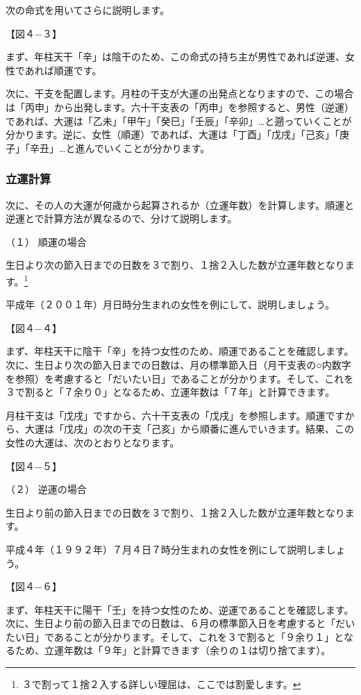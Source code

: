\documentclass[a5paper,11pt,dvipdfmx]{tarticle}
\begin{document}
次の命式を用いてさらに説明します。

【図４−３】

まず、年柱天干「辛」は陰干のため、この命式の持ち主が男性であれば逆運、女性であれば順運です。

次に、干支を配置します。月柱の干支が大運の出発点となりますので、この場合は「丙申」から出発します。六十干支表の「丙申」を参照すると、男性（逆運）であれば、大運は「乙未」「甲午」「癸巳」「壬辰」「辛卯」…と遡っていくことが分かります。逆に、女性（順運）であれば、大運は「丁酉」「戊戌」「己亥」「庚子」「辛丑」…と進んでいくことが分かります。

\subsubsection*{立運計算}
次に、その人の大運が何歳から起算されるか（立運年数）を計算します。順運と逆運とで計算方法が異なるので、分けて説明します。

（１）	順運の場合

生日より次の節入日までの日数を３で割り、１捨２入した数が立運年数となります。\footnote{３で割って１捨２入する詳しい理屈は、ここでは割愛します。}

平成年（２００１年）月日時分生まれの女性を例にして、説明しましょう。

【図４−４】

まず、年柱天干に陰干「辛」を持つ女性のため、順運であることを確認します。次に、生日より次の節入日までの日数は、月の標準節入日（月干支表の○内数字を参照）を考慮すると「だいたい日」であることが分かります。そして、これを３で割ると「７余り０」となるため、立運年数は「７年」と計算できます。

月柱干支は「戊戌」ですから、六十干支表の「戊戌」を参照します。順運ですから、大運は「戊戌」の次の干支「己亥」から順番に進んでいきます。結果、この女性の大運は、次のとおりとなります。

【図４−５】

（２）	逆運の場合

生日より前の節入日までの日数を３で割り、１捨２入した数が立運年数となります。

平成４年（１９９２年）７月４日７時分生まれの女性を例にして説明しましょう。

【図４−６】

まず、年柱天干に陽干「壬」を持つ女性のため、逆運であることを確認します。次に、生日より前の節入日までの日数は、６月の標準節入日を考慮すると「だいたい日」であることが分かります。そして、これを３で割ると「９余り１」となるため、立運年数は「９年」と計算できます（余りの１は切り捨てます）。
\end{document}

